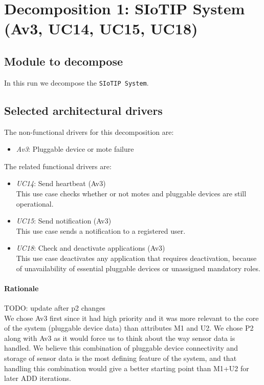 \section{Decomposition 1: SIoTIP System (Av3, UC14, UC15, UC18)}

\subsection{Module to decompose}
    In this run we decompose the \texttt{SIoTIP System}.


\subsection{Selected architectural drivers}
    The non-functional drivers for this decomposition are:
    \begin{itemize}
    	\item \emph{Av3}: Pluggable device or mote failure
    \end{itemize}

    \noindent The related functional drivers are:
    \begin{itemize}
    	\item \emph{UC14}: Send heartbeat (Av3) \\
              This use case checks whether or not motes and pluggable devices
              are still operational.
    	\item \emph{UC15}: Send notification (Av3) \\
              This use case sends a notification to a registered user.
    	\item \emph{UC18}: Check and deactivate applications (Av3) \\
              This use case deactivates any application that requires deactivation,
              because of unavailability of essential pluggable devices
              or unassigned mandatory roles.
    \end{itemize}

    \paragraph{Rationale}
        TODO: update after p2 changes \\
        We chose Av3 first since it had high priority and it was more relevant to
        the core of the system (pluggable device data) than attributes M1 and U2. We
        chose P2 along with Av3 as it would force us to think about the way
        sensor data is handled. We believe this combination of pluggable device connectivity and
        storage of sensor data is the most defining feature of the system, and that
        handling this combination would give a better starting point than M1+U2
        for later ADD iterations.


